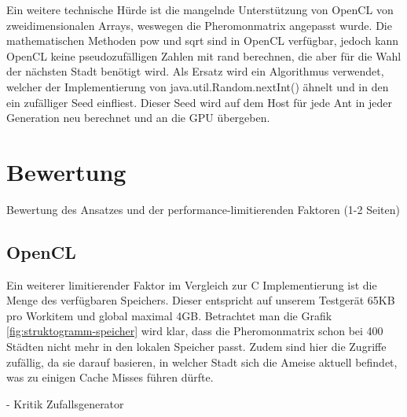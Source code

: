 Ein weitere technische Hürde ist die mangelnde Unterstützung von OpenCL von zweidimensionalen Arrays, weswegen die Pheromonmatrix angepasst wurde.
Die mathematischen Methoden pow und sqrt sind in OpenCL verfügbar, jedoch kann OpenCL keine pseudozufälligen Zahlen mit rand berechnen, die aber für die Wahl der nächsten Stadt benötigt wird.
Als Ersatz wird ein Algorithmus verwendet, welcher der Implementierung von java.util.Random.nextInt() ähnelt und in den ein zufälliger Seed einfliest.
Dieser Seed wird auf dem Host für jede Ant in jeder Generation neu berechnet und an die GPU übergeben.

\section{Bewertung}
Bewertung des Ansatzes und der performance-limitierenden Faktoren (1-2 Seiten)

\subsection{OpenCL}
Ein weiterer limitierender Faktor im Vergleich zur C Implementierung ist die Menge des verfügbaren Speichers.
Dieser entspricht auf unserem Testgerät 65KB pro Workitem und global maximal 4GB.
Betrachtet man die Grafik \ref{fig:struktogramm-speicher} wird klar, dass die Pheromonmatrix schon bei 400 Städten nicht mehr in den lokalen Speicher passt.
Zudem sind hier die Zugriffe zufällig, da sie darauf basieren, in welcher Stadt sich die Ameise aktuell befindet, was zu einigen Cache Misses führen dürfte.

- Kritik Zufallsgenerator